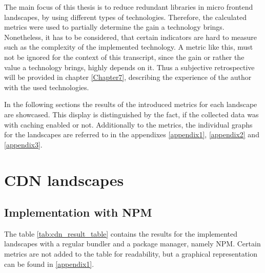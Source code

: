The main focus of this thesis is to reduce redundant libraries in micro frontend landscapes, by using different types of technologies. Therefore, the calculated metrics were used to partially determine the gain a technology brings. Nonetheless, it has to be considered, that certain indicators are hard to measure such as the complexity of the implemented technology.  
A metric like this, must not be ignored for the context of this transcript, since the gain or rather the value a technology brings, highly depends on it. Thus a subjective retrospective will be provided in chapter \ref{Chapter7}, describing the experience of the author with the used technologies.

In the following sections the results of the introduced metrics for each landscape are showcased. This display is distinguished by the fact, if the collected data was with caching enabled or not. Additionally to the metrics, the individual graphs for the landscapes are referred to in the appendixes \ref{appendix1}, \ref{appendix2} and \ref{appendix3}.

\section{CDN landscapes}

\subsection{Implementation with NPM}

The table \ref{tab:cdn_result_table} contains the results for the implemented landscapes with a regular bundler and a package manager, namely NPM. Certain metrics are not added to the table for readability, but a graphical representation can be found in \ref{appendix1}.

\scriptsize
\setlength{\mycolwidth}{\dimexpr \textwidth/5 - 2\tabcolsep}

